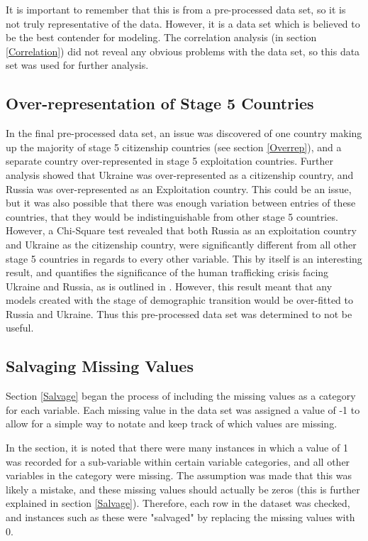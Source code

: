 \documentclass{article} %
\begin{document}
	It is important to remember that this is from a pre-processed data set, so it is not truly representative of the data. However, it is a data set which is believed to be the best contender for modeling. The correlation analysis (in section \ref{Correlation}) did not reveal any obvious problems with the data set, so this data set was used for further analysis.
	
	\subsection{Over-representation of Stage 5 Countries}
	
	In the final pre-processed data set, an issue was discovered of one country making up the majority of stage 5 citizenship countries (see section \ref{Overrep}), and a separate country over-represented in stage 5 exploitation countries. Further analysis showed that Ukraine was over-represented as a citizenship country, and Russia was over-represented as an Exploitation country. This could be an issue, but it was also possible that there was enough variation between entries of these countries, that they would be indistinguishable from other stage 5 countries. However, a Chi-Square test revealed that both Russia as an exploitation country and Ukraine as the citizenship country, were significantly different from all other stage 5 countries in regards to every other variable. This by itself is an interesting result, and quantifies the significance of the human trafficking crisis facing Ukraine and Russia, as is outlined in \cite{RussiaTrafficking}. However, this result meant that any models created with the stage of demographic transition would be over-fitted to Russia and Ukraine. Thus this pre-processed data set was determined to not be useful.
	
	\subsection{Salvaging Missing Values}
	
	Section \ref{Salvage} began the process of including the missing values as a category for each variable. Each missing value in the data set was assigned a value of -1 to allow for a simple way to notate and keep track of which values are missing.
	
	In the section, it is noted that there were many instances in which a value of 1 was recorded for a sub-variable within certain variable categories, and all other variables in the category were missing. The assumption was made that this was likely a mistake, and these missing values should actually be zeros (this is further explained in section \ref{Salvage}). Therefore, each row in the dataset was checked, and instances such as these were "salvaged" by replacing the missing values with 0.
	
\end{document}
